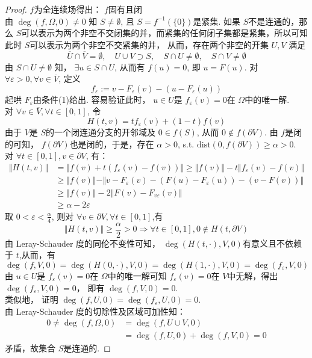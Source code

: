 \documentclass[a4,10pt]{ctexart}
\begin{document}
\begin{proof}
  $f$为全连续场得出： $f$固有且闭\\
  由 $\deg(f,\Omega, 0)\neq{0}$ 知 $S\neq{\emptyset}$, 且 $S=f^{-1}(\{0\})$是紧集. 如果 $S$不是连通的，那么 $S$可以表示为两个非空不交闭集的并，而紧集的任何闭子集都是紧集，所以可知此时 $S$可以表示为两个非空不交紧集的并， 从而，存在两个非空的开集 $U,V$ 满足 
  $$\overline{U}\cap\overline{V} = \emptyset, \quad U\cup{V}\supset{S}, \quad S\cap{U}\neq{\emptyset}, \quad S\cap{V}\neq\emptyset$$
  由 $S\cap{U}\neq\emptyset$ 知， $\exists{u}\in{S\cap{U}}$, 从而有 $f(u)=0$, 即 $u=F(u)$. 对 $\forall{\varepsilon}>0, \forall{v}\in\overline{V}$, 定义
  \begin{equation}
    f_{\varepsilon}:=v-F_{\varepsilon}(v)-(u-F_{\varepsilon}(u))
  \end{equation}
  起哄 $F_{\varepsilon}$由条件(1)给出. 容易验证此时， $u\in{U}$是 $f_{\varepsilon}(v)=0$在 $\Omega$中的唯一解.\\ 
  对 $\forall{v}\in\overline{V},\forall{t}\in[0,1]$, 令
  \begin{equation}
    H(t,v) = tf_{\varepsilon}(v) + (1-t)f(v)
  \end{equation}
  由于 $V$是 $S$的一个闭连通分支的开邻域及 $0\in{f(S)}$, 从而 $0\notin{f(\partial{V})}$. 由 $f$是闭的可知， $f(\partial{V})$也是闭的，于是，存在 $\alpha>0$, s.t. $\mathrm{dist}(0, f(\partial{V}))\ge\alpha>0$.\\ 
  对 $\forall{t}\in[0,1], v\in\partial{V}$, 有：
  \[
  \begin{aligned}
  \Vert{H(t,v)}\Vert &=  \Vert{f(v)+t(f_{\varepsilon}(v)-f(v))}\Vert \ge \Vert{f(v)}\Vert - t \Vert{f_{\varepsilon}(v)-f(v)}\Vert\\ 
  &\ge \Vert{f(v)}\Vert - \Vert{v-F_{\varepsilon}(v)-(F(u)-F_{\varepsilon}(u))-(v-F(v))}\Vert\\ 
  &\ge \Vert{f(v)}\Vert - 2 \Vert{F(v)-F_{v\varepsilon}(v)}\Vert\\ 
  &\ge \alpha - 2\varepsilon
  \end{aligned}  
  \]
  取 $0<\varepsilon<\frac{\alpha}{4}$, 则对 $\forall{v}\in\partial{V},\forall{t}\in[0,1]$,有
  $$\Vert{H(t,v)}\Vert\ge\frac{\alpha}{2}>0 \Rightarrow \forall{t}\in[0,1], 0\notin{H(t,\partial{V})}$$
  由 Leray-Schauder 度的同伦不变性可知， $\deg(H(t, \cdot), V, 0)$有意义且不依赖于 $t$,从而，有
  \begin{equation}
    \deg(f,V,0) = \deg(H(0,\cdot),V,0) = \deg(H(1,\cdot), V, 0) = \deg(f_{\varepsilon},V,0)
  \end{equation}
  由 $u\in{U}$是 $f_{\varepsilon}(v)=0$在 $\Omega$中的唯一解可知 $f_{\varepsilon}(v)=0$在 $V$中无解，得出 $\deg(f_{\varepsilon}, V, 0)=0$， 即有 $\deg(f,V,0)=0$.\\ 
  类似地， 证明 $\deg(f,U,0)=\deg(f_{\varepsilon},U,0)=0$. \\
  由 Leray-Schauder 度的切除性及区域可加性知：
  \[
  \begin{aligned}
  0 \neq \deg(f,\Omega,0) &= \deg(f,U\cup{V},0) \\ 
  & = \deg(f,U,0) + \deg(f,V,0)=0
  \end{aligned}  
  \]
  矛盾，故集合 $S$是连通的.
\end{proof}
\end{document}

